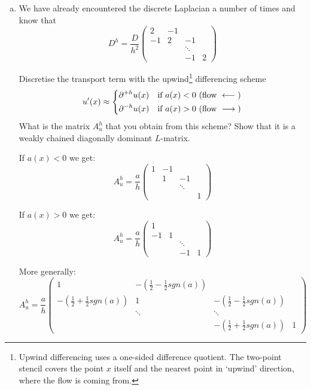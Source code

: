 \documentclass[10pt,letterpaper]{scrartcl}
\begin{document}
\begin{enumerate}[(a)]
\item We have already encountered the discrete Laplacian a number of times and know that
\begin{equation*}
D^h = \frac{D}{h^2} \left(
\begin{array}{cccc}
2 & -1\\
-1 & 2 & -1\\
& & \ddots\\
& & -1 & 2
\end{array}
\right)
\end{equation*}

Discretise the transport term with the upwind\footnote{Upwind differencing uses a one-sided difference quotient. The two-point stencil covers the point $x$ itself and the nearest point in `upwind' direction, where the flow is coming from.} differencing scheme
\begin{equation*}
u'(x) \approx
\begin{dcases}
\partial^{+h}u(x) & \text{if } a(x)<0 \text{ (flow } \longleftarrow \text{)}\\
\partial^{-h}u(x) & \text{if } a(x)>0 \text{ (flow } \longrightarrow \text{)}
\end{dcases}
\end{equation*}
What is the matrix $A^h_u$ that you obtain from this scheme? Show that it is a weakly chained diagonally dominant $L$-matrix.

If $a(x) < 0$ we get:
\begin{equation*}
A^h_u = \frac{a}{h} \left(
\begin{array}{cccc}
1 & -1\\
& 1 & -1\\
& & \ddots\\
& & & 1
\end{array}
\right)
\end{equation*}

If $a(x) > 0$ we get:
\begin{equation*}
A^h_u = \frac{a}{h} \left(
\begin{array}{cccc}
1\\
-1 & 1\\
& & \ddots\\
& & -1 & 1
\end{array}
\right)
\end{equation*}

More generally:
\begin{equation*}
A^h_u = \frac{a}{h} \left(
\begin{array}{cccc}
1 & -(\frac{1}{2}-\frac{1}{2}sgn(a))\\
-(\frac{1}{2}+\frac{1}{2}sgn(a)) & 1 & -(\frac{1}{2}-\frac{1}{2}sgn(a))\\
& \ddots & \ddots\\
& & -(\frac{1}{2}+\frac{1}{2}sgn(a)) & 1
\end{array}
\right)
\end{equation*}


\end{enumerate}
\end{document}
